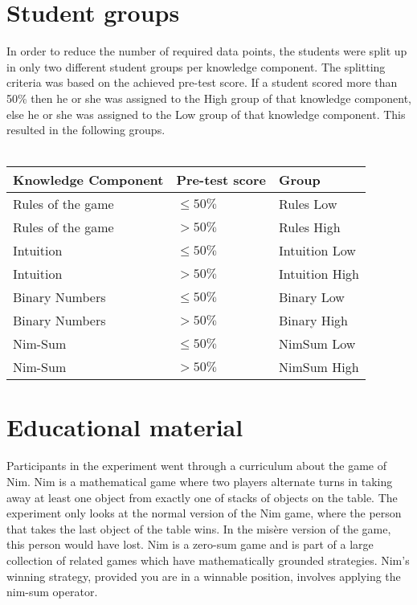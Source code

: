 \section{Student groups}
\label{sec:setup_groups}
In order to reduce the number of required data points, the students were split
up in only two different student groups per knowledge component. The splitting
criteria was based on the achieved pre-test score. If a student scored more
than 50\% then he or she was assigned to the High group of that knowledge
component, else he or she was assigned to the Low group of that knowledge
component. This resulted in the following groups.\\\\
\begin{tabular}{lll}\hline
	\textbf{Knowledge Component} & \textbf{Pre-test score}    & \textbf{Group} \\\hline
	Rules of the game	& $\leq 50\%$		& Rules Low \\
	Rules of the game	& $> 50\%$			& Rules High \\
	Intuition			& $\leq 50\%$		& Intuition Low \\
	Intuition			& $> 50\%$			& Intuition High \\
	Binary Numbers		& $\leq 50\%$		& Binary Low \\
	Binary Numbers		& $> 50\%$			& Binary High \\
	Nim-Sum				& $\leq 50\%$		& NimSum Low \\
	Nim-Sum				& $> 50\%$			& NimSum High \\
\end{tabular}
\section{Educational material}
\label{sec:setup_material}
Participants in the experiment went through a curriculum about the game of Nim.
Nim is a mathematical game where two players alternate turns in taking away at
least one object from exactly one of stacks of objects on the table. The
experiment only looks at the normal version of the Nim game, where the person
that takes the last object of the table wins. In the mis\`{e}re version of the
game, this person would have lost. Nim is a zero-sum game and is part of a
large collection of related games which have mathematically grounded
strategies. Nim's winning strategy, provided you are in a winnable position,
involves applying the nim-sum operator. %

